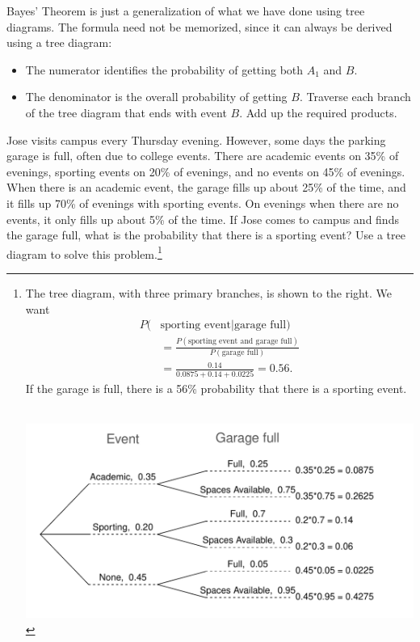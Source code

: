 Bayes' Theorem is just a generalization of what we have done using tree diagrams. The formula need not be memorized, since it can always be derived using a tree diagram:
\begin{itemize}
\setlength{\itemsep}{0mm}
\item The numerator identifies the probability of getting both $A_1$ and $B$.
\item The denominator is the overall probability of getting $B$.  Traverse each branch of the tree diagram that ends with event $B$.  Add up the required products.
\end{itemize}

\begin{exercise} \label{exerciseForParkingLotOnCampusBeingFullAndWhetherOrNotThereIsASportingEvent}
Jose visits campus every Thursday evening. However, some days the parking garage is full, often due to college events. There are academic events on 35\% of evenings, sporting events on 20\% of evenings, and no events on 45\% of evenings. When there is an academic event, the garage fills up about 25\% of the time, and it fills up 70\% of evenings with sporting events. On evenings when there are no events, it only fills up about 5\% of the time. If Jose comes to campus and finds the garage full, what is the probability that there is a sporting event? Use a tree diagram to solve this problem.\footnote{\begin{minipage}[t]{0.47\textwidth}
The tree diagram, with three primary branches, is shown to the right. We want
\begin{align*}
P(&\text{sporting event} | \text{garage full}) \\
&= \frac{P(\text{sporting event and garage full})}{P(\text{garage full})} \\
&=\frac{0.14}{0.0875 + 0.14 + 0.0225} = 0.56.
\end{align*}
If the garage is full, there is a 56\% probability that there is a sporting event. \vspace{0.1mm} \\\
\end{minipage}
\begin{minipage}[c]{0.5\textwidth}
\includegraphics[width=\textwidth]{ch_probability/figures/treeDiagramGarage/treeDiagramGarage}\vspace{-30mm}
\end{minipage}}
\end{exercise}

